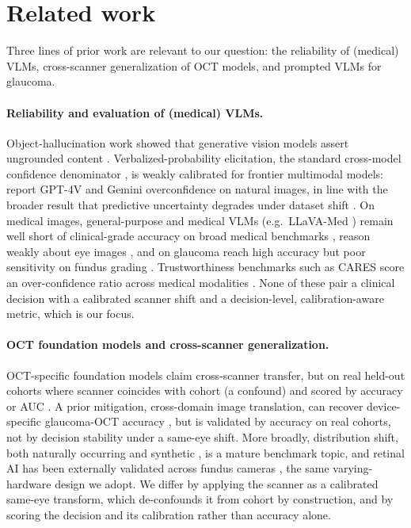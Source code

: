 \section{Related work}
\label{sec:related}

Three lines of prior work are relevant to our question: the reliability of (medical) VLMs, cross-scanner
generalization of OCT models, and prompted VLMs for glaucoma.

\paragraph{Reliability and evaluation of (medical) VLMs.} Object-hallucination work showed that generative vision
models assert ungrounded content \citep{rohrbach2018chair, li2023pope}. Verbalized-probability elicitation, the
standard cross-model confidence denominator \citep{lin2022verbalized, tian2023calibration, xiong2024uncertainty}, is
weakly calibrated for frontier multimodal models: \citet{groot2024overconfidence} report GPT-4V and Gemini
overconfidence on natural images, in line with the broader result that predictive uncertainty degrades under
dataset shift \citep{ovadia2019shift}. On medical images, general-purpose and medical VLMs (e.g.\ LLaVA-Med
\citep{li2023llavamed}) remain well short of clinical-grade accuracy on broad medical benchmarks
\citep{chen2024gmaimmbench}, reason weakly about eye
images \citep{qin2024lmod}, and on glaucoma reach high accuracy
but poor sensitivity on fundus grading \citep{alryalat2024chatgpt}. Trustworthiness benchmarks such
as CARES score an over-confidence ratio across medical modalities \citep{xia2024cares}. None of these pair a clinical
decision with a calibrated scanner shift and a decision-level, calibration-aware metric, which is our focus.

\paragraph{OCT foundation models and cross-scanner generalization.} OCT-specific foundation models claim cross-scanner
transfer, but on real held-out cohorts where scanner coincides with cohort (a confound) and scored by accuracy or
AUC \citep{zhou2023retfound, liu2024octcubem, morano2025mirage}. A prior mitigation, cross-domain image translation,
can recover device-specific glaucoma-OCT accuracy \citep{belghith2025crossdomain}, but is validated by accuracy on
real cohorts, not by decision stability under a same-eye shift. More broadly, distribution shift, both naturally
occurring \citep{koh2021wilds} and synthetic \citep{hendrycks2019corruptions}, is a mature benchmark topic, and
retinal AI has been externally validated across fundus cameras \citep{tsai2022crosscamera}, the same varying-hardware
design we adopt. We differ by applying the scanner as a calibrated same-eye transform, which de-confounds it from
cohort by construction, and by scoring the decision and its calibration rather than accuracy alone.


